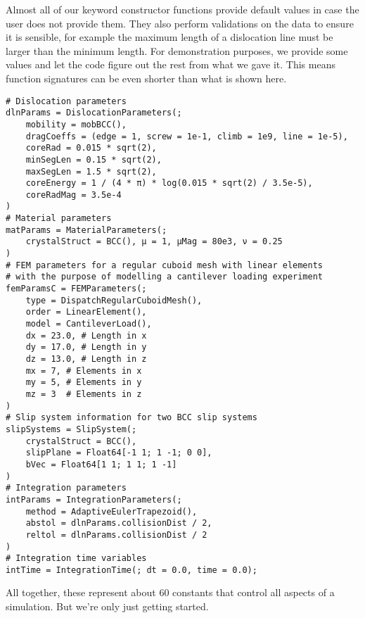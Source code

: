 Almost all of our keyword constructor functions provide default values in case the user does not provide them. They also perform validations on the data to ensure it is sensible, for example the maximum length of a dislocation line must be larger than the minimum length. For demonstration purposes, we provide some values and let the code figure out the rest from what we gave it. This means function signatures can be even shorter than what is shown here.
\begin{verbatim}
# Dislocation parameters
dlnParams = DislocationParameters(;
    mobility = mobBCC(),
    dragCoeffs = (edge = 1, screw = 1e-1, climb = 1e9, line = 1e-5),
    coreRad = 0.015 * sqrt(2),
    minSegLen = 0.15 * sqrt(2),
    maxSegLen = 1.5 * sqrt(2),
    coreEnergy = 1 / (4 * π) * log(0.015 * sqrt(2) / 3.5e-5),
    coreRadMag = 3.5e-4
)
# Material parameters
matParams = MaterialParameters(;
    crystalStruct = BCC(), μ = 1, μMag = 80e3, ν = 0.25
)
# FEM parameters for a regular cuboid mesh with linear elements
# with the purpose of modelling a cantilever loading experiment
femParamsC = FEMParameters(;
    type = DispatchRegularCuboidMesh(),
    order = LinearElement(),
    model = CantileverLoad(),
    dx = 23.0, # Length in x
    dy = 17.0, # Length in y
    dz = 13.0, # Length in z
    mx = 7, # Elements in x
    my = 5, # Elements in y
    mz = 3  # Elements in z
)
# Slip system information for two BCC slip systems
slipSystems = SlipSystem(;
    crystalStruct = BCC(),
    slipPlane = Float64[-1 1; 1 -1; 0 0],
    bVec = Float64[1 1; 1 1; 1 -1]
)
# Integration parameters
intParams = IntegrationParameters(;
    method = AdaptiveEulerTrapezoid(),
    abstol = dlnParams.collisionDist / 2,
    reltol = dlnParams.collisionDist / 2
)
# Integration time variables
intTime = IntegrationTime(; dt = 0.0, time = 0.0);
\end{verbatim}
All together, these represent about 60 constants that control all aspects of a simulation. But we're only just getting started.

